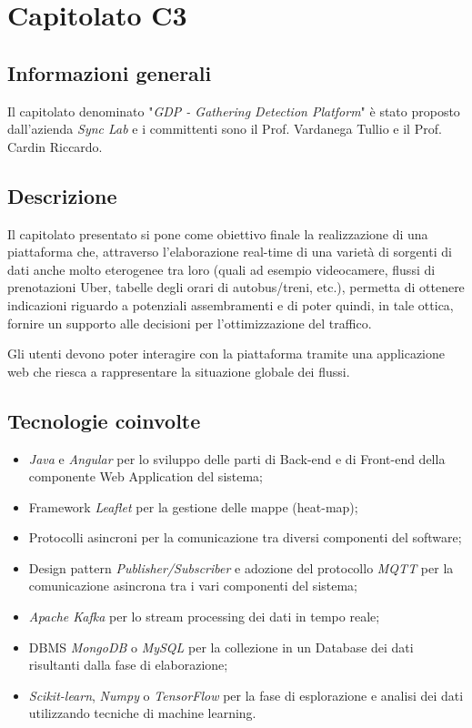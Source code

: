\section{Capitolato C3}

\subsection{Informazioni generali}{

Il capitolato denominato "\textit{GDP - Gathering Detection Platform}" è stato proposto dall'azienda \textit{Sync Lab} e i committenti sono il Prof. Vardanega Tullio e il Prof. Cardin Riccardo.
}

\subsection{Descrizione}{
Il capitolato presentato si pone come obiettivo finale la realizzazione di una piattaforma che, attraverso l'elaborazione real-time di una varietà di sorgenti di dati anche molto eterogenee tra loro (quali ad esempio videocamere, flussi di prenotazioni Uber, tabelle degli orari di autobus/treni, etc.), permetta di ottenere indicazioni riguardo a potenziali assembramenti e di poter quindi, in tale ottica, fornire un supporto alle decisioni per l'ottimizzazione del traffico.

Gli utenti devono poter interagire con la piattaforma tramite una applicazione web che riesca a rappresentare la situazione globale dei flussi.
}

\subsection{Tecnologie coinvolte}{
\begin{itemize}
\item \textit{Java} e \textit{Angular} per lo sviluppo delle parti di Back-end e di Front-end della componente Web Application del sistema; 
\item Framework \textit{Leaflet} per la gestione delle mappe (heat-map);
\item Protocolli asincroni per la comunicazione tra diversi componenti del software;
\item Design pattern \textit{Publisher/Subscriber} e adozione del protocollo \textit{MQTT} per la comunicazione asincrona tra i vari componenti del sistema;
\item \textit{Apache Kafka} per lo stream processing dei dati in tempo reale;
\item DBMS \textit{MongoDB} o \textit{MySQL}  per la collezione in un Database dei dati risultanti dalla fase di elaborazione;
\item \textit{Scikit-learn}, \textit{Numpy} o \textit{TensorFlow} per la fase di esplorazione e analisi dei dati utilizzando tecniche di machine learning.
\end{itemize}
}

